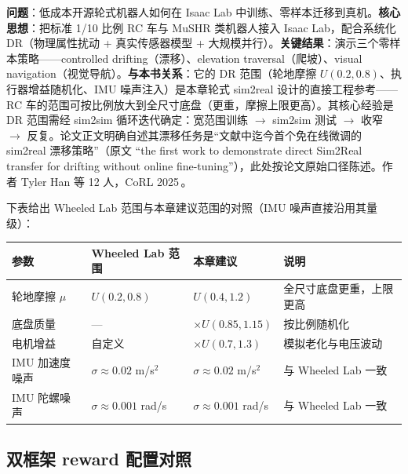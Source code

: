 \begin{paper}\label{paper:rlmc-wh-wheeledlab}
\textbf{问题}：低成本开源轮式机器人如何在 Isaac Lab 中训练、零样本迁移到真机。\textbf{核心思想}：把标准 1/10 比例 RC 车与 MuSHR 类机器人接入 Isaac Lab，配合系统化 DR（物理属性扰动 + 真实传感器模型 + 大规模并行）。\textbf{关键结果}：演示三个零样本策略——controlled drifting（漂移）、elevation traversal（爬坡）、visual navigation（视觉导航）。\textbf{与本书关系}：它的 DR 范围（轮地摩擦 $U(0.2,0.8)$、执行器增益随机化、IMU 噪声注入）是本章轮式 sim2real 设计的直接工程参考——RC 车的范围可按比例放大到全尺寸底盘（更重，摩擦上限更高）。其核心经验是 DR 范围需经 sim2sim 循环迭代确定：宽范围训练 $\to$ sim2sim 测试 $\to$ 收窄 $\to$ 反复。论文正文明确自述其漂移任务是“文献中迄今首个免在线微调的 sim2real 漂移策略”（原文 “the first work to demonstrate direct Sim2Real transfer for drifting without online fine-tuning”），此处按论文原始口径陈述。作者 Tyler Han 等 12 人，CoRL 2025\,\cite{han2025wheeledlab}。
\end{paper}

下表给出 Wheeled Lab 范围与本章建议范围的对照（IMU 噪声直接沿用其量级）：

\begin{center}
\small
\begin{tabular}{@{}llll@{}}
\toprule
参数 & Wheeled Lab 范围 & 本章建议 & 说明 \\
\midrule
轮地摩擦 $\mu$ & $U(0.2,0.8)$ & $U(0.4,1.2)$ & 全尺寸底盘更重，上限更高 \\
底盘质量 & --- & $\times U(0.85,1.15)$ & 按比例随机化 \\
电机增益 & 自定义 & $\times U(0.7,1.3)$ & 模拟老化与电压波动 \\
IMU 加速度噪声 & $\sigma\approx0.02$ m/s$^2$ & $\sigma\approx0.02$ m/s$^2$ & 与 Wheeled Lab 一致 \\
IMU 陀螺噪声 & $\sigma\approx0.001$ rad/s & $\sigma\approx0.001$ rad/s & 与 Wheeled Lab 一致 \\
\bottomrule
\end{tabular}
\end{center}


\subsection{双框架 reward 配置对照}
\label{sec:rlmc-wh-reward-api}

